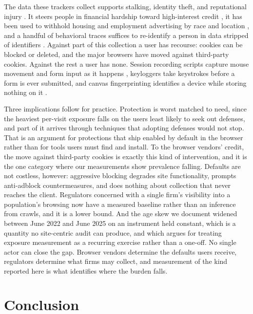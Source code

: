 \documentclass[12pt, letterpaper]{article}
\begin{document}
The data these trackers collect supports stalking, identity theft, and reputational injury \citep{citron2022privacy}. It steers people in financial hardship toward high-interest credit \citep{christl2016networks}, it has been used to withhold housing and employment advertising by race and location \citep{angwin2016facebook}, and a handful of behavioral traces suffices to re-identify a person in data stripped of identifiers \citep{achara2015unicity, deanonymizing}. Against part of this collection a user has recourse: cookies can be blocked or deleted, and the major browsers have moved against third-party cookies. Against the rest a user has none. Session recording scripts capture mouse movement and form input as it happens \citep{leakyforms}, keyloggers take keystrokes before a form is ever submitted, and canvas fingerprinting identifies a device while storing nothing on it \citep{Acar2014, MS12}.
 
Three implications follow for practice. Protection is worst matched to need, since the heaviest per-visit exposure falls on the users least likely to seek out defenses, and part of it arrives through techniques that adopting defenses would not stop. That is an argument for protections that ship enabled by default in the browser rather than for tools users must find and install. To the browser vendors' credit, the move against third-party cookies is exactly this kind of intervention, and it is the one category where our measurements show prevalence falling. Defaults are not costless, however: aggressive blocking degrades site functionality, prompts anti-adblock countermeasures, and does nothing about collection that never reaches the client. Regulators concerned with a single firm's visibility into a population's browsing now have a measured baseline rather than an inference from crawls, and it is a lower bound. And the age skew we document widened between June 2022 and June 2025 on an instrument held constant, which is a quantity no site-centric audit can produce, and which argues for treating exposure measurement as a recurring exercise rather than a one-off. No single actor can close the gap. Browser vendors determine the defaults users receive, regulators determine what firms may collect, and measurement of the kind reported here is what identifies where the burden falls.

\section{Conclusion}
\label{sec:conclusion}
 
\end{document}
